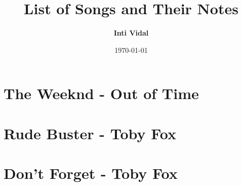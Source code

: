 \documentclass[11pt, a4paper]{report}
\title{\Huge\textbf{List of Songs and Their Notes}\\[0.5em]}
\author{\textbf{Inti Vidal}}
\date{\today}
\begin{document}
\maketitle
\tableofcontents
\newpage

\chapter*{The Weeknd - Out of Time}


\chapter*{Rude Buster - Toby Fox}


\chapter*{Don't Forget - Toby Fox}

\end{document}
